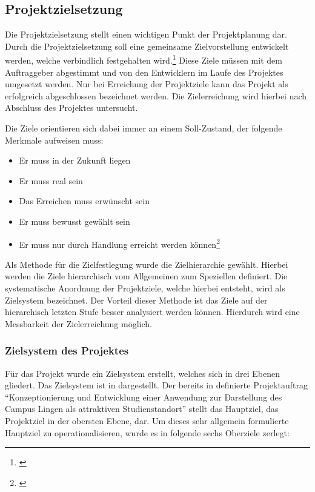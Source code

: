 \subsection{Projektzielsetzung}
\label{sec:Projektzielsetzung}

Die Projektzielsetzung stellt einen wichtigen Punkt der Projektplanung dar.
Durch die Projektzielsetzung soll eine gemeinsame Zielvorstellung entwickelt
werden, welche verbindlich festgehalten wird.\footnote{\citet[S.~34]{litke2007}}
Diese Ziele müssen mit dem Auftraggeber abgestimmt und von den Entwicklern im
Laufe des Projektes umgesetzt werden. Nur bei Erreichung der Projektziele kann
das Projekt als erfolgreich abgeschlossen bezeichnet werden. Die Zielerreichung
wird hierbei nach Abschluss des Projektes untersucht. 

\clearpage

Die Ziele orientieren
sich dabei immer an einem Soll-Zustand, der folgende Merkmale aufweisen muss:

\begin{itemize}
  \item Er muss in der Zukunft liegen
  \item Er muss real sein
  \item Das Erreichen muss erwünscht sein
  \item Er muss bewusst gewählt sein
  \item Er muss nur durch Handlung erreicht werden
  können\footnote{\citet[S.~33]{litke2007}}
\end{itemize}

Als Methode für die Zielfestlegung wurde die Zielhierarchie gewählt. Hierbei
werden die Ziele hierarchisch vom Allgemeinen zum Speziellen definiert. Die
systematische Anordnung der Projektziele, welche hierbei entsteht, wird als
Zielsystem bezeichnet. Der Vorteil dieser Methode ist das Ziele auf der
hierarchisch letzten Stufe besser analysiert werden können. Hierdurch wird eine
Messbarkeit der Zielerreichung möglich. 

\subsubsection{Zielsystem des Projektes}
\label{sec:Zielsystem}

Für das Projekt wurde ein Zielsystem erstellt, welches sich in drei Ebenen
gliedert. Das Zielsystem ist in  dargestellt. Der bereits in
 definierte Projektauftrag "`Konzeptionierung und
Entwicklung einer Anwendung zur Darstellung des Campus Lingen als attraktiven
Studienstandort"' stellt das Hauptziel, das Projektziel in der obersten Ebene,
dar. Um dieses sehr allgemein formulierte Hauptziel zu operationalisieren, wurde
es in folgende sechs Oberziele zerlegt:

